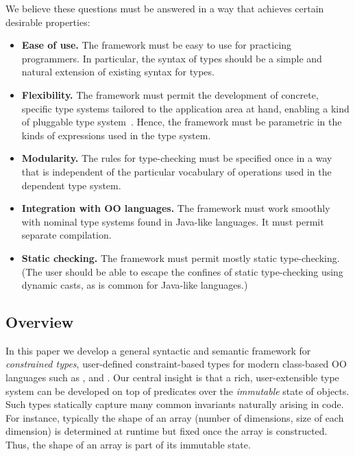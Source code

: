 We believe these questions must be answered in a way that achieves
certain desirable properties:
\begin{itemize}
\item 
{\bf Ease of use.}  The framework must be easy to use for practicing
programmers. In particular, the syntax of types should be a simple and
natural extension of existing syntax for types.

\item
{\bf Flexibility.}
The framework
must permit the development of concrete,
specific type systems tailored to the application area at
hand, enabling a kind of pluggable type system~\cite{bracha04-pluggable}.
Hence, the framework must be parametric in the kinds of
expressions used in the type system.

\item
{\bf Modularity.}
The rules for type-checking
must be specified once in a way that is independent of the
particular vocabulary of operations used in the dependent type
system.

\item
{\bf Integration with OO languages.}
The framework must work smoothly with nominal type systems found in
Java-like languages. It must permit separate compilation.

\item
{\bf Static checking.}  The framework must permit mostly static
type-checking. (The user should be able to escape the confines of
static type-checking using dynamic casts, as is common for Java-like
languages.)
\end{itemize}

\subsection{Overview}

In this paper we develop a general syntactic and semantic framework
for {\em constrained types}, user-defined constraint-based types for
modern class-based OO languages such as \java{}, \csharp{} and
\Xten{}. Our central insight is that a rich, user-extensible type
system can be developed on top of predicates over the {\em immutable}
state of objects. Such types statically capture many common invariants
naturally arising in code. For instance, typically the shape of an
array (number of dimensions, size of each dimension) is determined at
runtime but fixed once the array is constructed. Thus, the shape of an
array is part of its immutable state.

